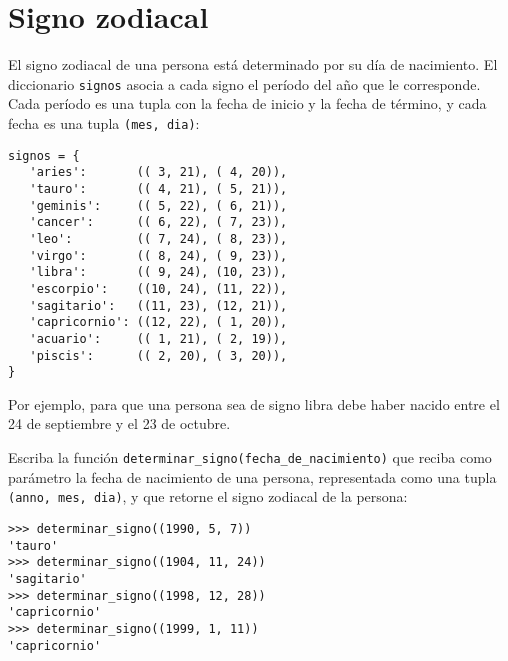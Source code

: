 \section{Signo zodiacal}

El signo zodiacal de una persona está determinado por su día de nacimiento.
El diccionario \lstinline!signos! asocia a cada signo el período del año
que le corres\-ponde. Cada período es una tupla con la fecha de inicio y
la fecha de término, y cada fecha es una tupla \lstinline!(mes, dia)!:
\begin{lstlisting}
signos = {
   'aries':       (( 3, 21), ( 4, 20)),
   'tauro':       (( 4, 21), ( 5, 21)),
   'geminis':     (( 5, 22), ( 6, 21)),
   'cancer':      (( 6, 22), ( 7, 23)),
   'leo':         (( 7, 24), ( 8, 23)),
   'virgo':       (( 8, 24), ( 9, 23)),
   'libra':       (( 9, 24), (10, 23)),
   'escorpio':    ((10, 24), (11, 22)),
   'sagitario':   ((11, 23), (12, 21)),
   'capricornio': ((12, 22), ( 1, 20)),
   'acuario':     (( 1, 21), ( 2, 19)),
   'piscis':      (( 2, 20), ( 3, 20)),
}
\end{lstlisting}

Por ejemplo, para que una persona sea de signo libra debe haber nacido
entre el 24 de septiembre y el 23 de octubre.

Escriba la función \lstinline!determinar_signo(fecha_de_nacimiento)! que
reciba como parámetro la fecha de nacimiento de una persona,
representada como una tupla \lstinline!(anno, mes, dia)!, y que retorne
el signo zodiacal de la persona:
\begin{lstlisting}
>>> determinar_signo((1990, 5, 7))
'tauro'
>>> determinar_signo((1904, 11, 24))
'sagitario'
>>> determinar_signo((1998, 12, 28))
'capricornio'
>>> determinar_signo((1999, 1, 11))
'capricornio'
\end{lstlisting}

